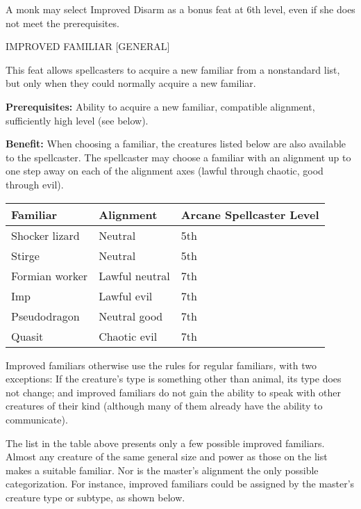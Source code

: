 \documentclass{article}
\begin{document}
A monk may select Improved Disarm as a bonus feat at 6th level, even if she does 
not meet the prerequisites.

\vspace{12pt}
IMPROVED FAMILIAR [GENERAL]

This feat allows spellcasters to acquire a new familiar from a nonstandard list, 
but only when they could normally acquire a new familiar.

\textbf{Prerequisites:} Ability to acquire a new familiar, compatible alignment, 
sufficiently high level (see below).

\textbf{Benefit:} When choosing a familiar, the creatures listed below are also 
available to the spellcaster. The spellcaster may choose a familiar with an alignment 
up to one step away on each of the alignment axes (lawful through chaotic, good 
through evil).

\vspace{12pt}
\begin{tabular}{|>{\raggedright}p{63pt}|>{\raggedright}p{57pt}|>{\raggedright}p{72pt}|}
\hline
F\textbf{amiliar } & A\textbf{lignment } & A\textbf{rcane Spellcaster Level}\tabularnewline
\hline
Shocker lizard  & Neutral  & 5th\tabularnewline
\hline
Stirge  & Neutral  & 5th\tabularnewline
\hline
Formian worker  & Lawful neutral  & 7th\tabularnewline
\hline
Imp  & Lawful evil  & 7th\tabularnewline
\hline
Pseudodragon  & Neutral good  & 7th\tabularnewline
\hline
Quasit  & Chaotic evil  & 7th\tabularnewline
\hline
\end{tabular}

\vspace{12pt}
Improved familiars otherwise use the rules for regular familiars\textit{, }with 
two exceptions: If the creature's type is something other than animal, its type 
does not change; and improved familiars do not gain the ability to speak with other 
creatures of their kind (although many of them already have the ability to communicate).

\vspace{12pt}
The list in the table above presents only a few possible improved familiars. Almost 
any creature of the same general size and power as those on the list makes a suitable 
familiar. Nor is the master's alignment the only possible categorization. For instance, 
improved familiars could be assigned by the master's creature type or subtype, 
as shown below.
\end{document}

